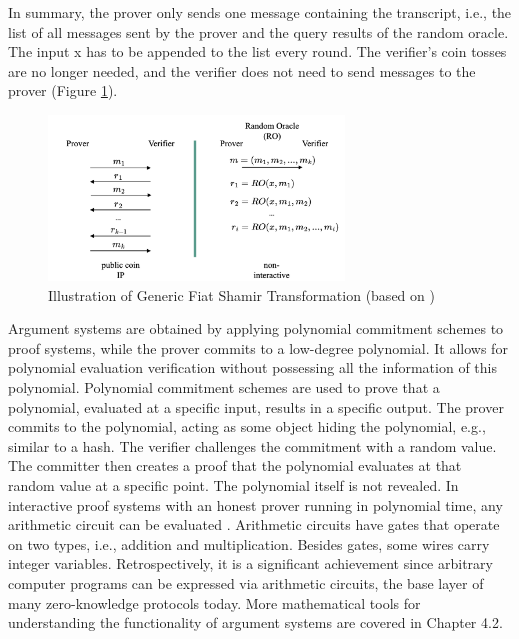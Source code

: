 In summary, the prover only sends one message containing the transcript, i.e., the list of all messages sent by the prover and the query results of the random oracle. The input x has to be appended to the list every round. The verifier's coin tosses are no longer needed, and the verifier does not need to send messages to the prover (Figure \ref{fig:FST}).
\begin{figure}[hbt]
	\centering
		\includegraphics[width=0.7\textwidth]{Pictures/FST.png}
	\caption{Illustration of Generic Fiat Shamir Transformation (based on \citet{Thaler})}
	\label{fig:FST}
\end{figure}
Argument systems are obtained by applying polynomial commitment schemes to proof systems, while the prover commits to a low-degree polynomial. It allows for polynomial evaluation verification without possessing all the information of this polynomial. Polynomial commitment schemes are used to prove that a polynomial, evaluated at a specific input, results in a specific output. The prover commits to the polynomial, acting as some object hiding the polynomial, e.g., similar to a hash. The verifier challenges the commitment with a random value. The committer then creates a proof that the polynomial evaluates at that random value at a specific point. The polynomial itself is not revealed. In interactive proof systems with an honest prover running in polynomial time, any arithmetic circuit can be evaluated \citep{GKR10.1145/1374376.1374396}. Arithmetic circuits have gates that operate on two types, i.e., addition and multiplication. Besides gates, some wires carry integer variables. Retrospectively, it is a significant achievement since arbitrary computer programs can be expressed via arithmetic circuits, the base layer of many zero-knowledge protocols today. More mathematical tools for understanding the functionality of argument systems are covered in Chapter 4.2.
